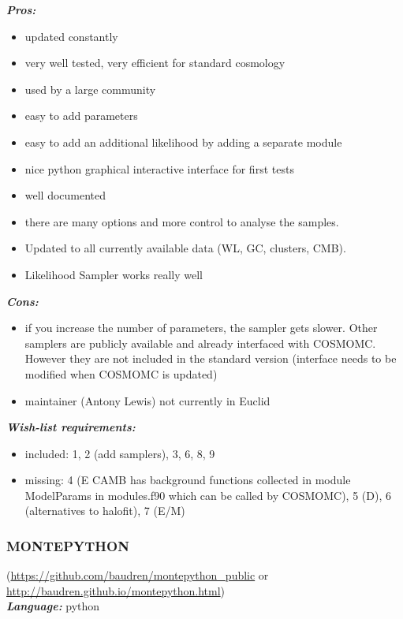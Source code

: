 {\it \bf Pros:}
\begin{itemize}
 \item updated constantly
 \item very well tested, very efficient for standard cosmology
 \item used by a large community
 \item easy to add parameters
 \item easy to add an additional likelihood by adding a separate module
 \item nice python graphical interactive interface for first tests
 \item well documented
 \item there are many options and more control to analyse the samples. 
 \item Updated to all currently available data (WL, GC, clusters, CMB).
 \item Likelihood Sampler works really well
\end{itemize}

{\it \bf Cons: }
\begin{itemize}
 \item if you increase the number of parameters, the sampler gets slower. Other samplers are publicly available and already interfaced with COSMOMC. However they are not included in the 
 standard version (interface needs to be modified when COSMOMC is updated)
 \item maintainer (Antony Lewis) not currently in Euclid
\end{itemize}

{\it \bf Wish-list requirements: }
\begin{itemize}
 \item included: 1, 2 (add samplers), 3, 6, 8, 9
 \item missing: 4 (E CAMB has background functions collected in module ModelParams in modules.f90 which can be called by COSMOMC), 5 (D), 6 (alternatives to halofit), 7 (E/M)
\end{itemize}

\newpage
\subsubsection{MONTEPYTHON}(\url{https://github.com/baudren/montepython_public} or \url{http://baudren.github.io/montepython.html})\\

{\it \bf Language:} python\\

